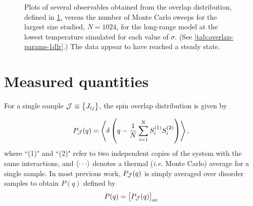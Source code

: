 \begin{figure}
  \centering
  \begin{subfigure}[b]{0.32\textwidth}
    \centering
    
    \label{fig:delta-vs-t-1dlr}
  \end{subfigure}
  \begin{subfigure}[b]{0.32\textwidth}
    \centering
    
    \label{fig:Iav-vs-t-1dlr}
  \end{subfigure}
  \begin{subfigure}[b]{0.32\textwidth}
    \centering
    
    \label{fig:Imed-vs-t-1dlr}
  \end{subfigure}
  \caption[
    Plots of various statistics of the spin overlap distribution as a function
    of Monte Carlo time, indicating that the quantities have reached a steady
    state.
  ]
  {
    Plots of several observables obtained from the overlap distribution,
    defined in \cref{sec:overlap-quantities}, versus the number of Monte Carlo
    sweeps for the largest size studied, $N=1024$, for the long-range model at
    the lowest temperature simulated for each value of $\sigma$. (See
    \cref{tab:overlap-params-1dlr}.) The data appear to have reached a steady
    state.
  }
  \label{fig:overlap-stats-vs-time}
\end{figure}


\section{Measured quantities}
\label{sec:overlap-quantities}

For a single sample $\mathcal{J}\equiv\cbr{J_{ij}}$, the spin overlap
distribution is given by

\begin{equation}
  P_{\mathcal{J}}(q) = \left< \delta\left(q - \frac{1}{N}\sum_{i=1}^N S_i^{(1)} S_i^{(2)}\right) \right>,
  \label{eq:sample-pofq}
\end{equation}
where ``(1)" and ``(2)" refer to two independent copies of the system with the
same interactions, and $\av{\cdots}$ denotes a thermal (\emph{i.e.} Monte
Carlo) average for a single sample. In most previous work, $P_{\mathcal{J}}(q)$
is simply averaged over disorder samples to obtain $P(q)$ defined by
\begin{equation}
  P(q) = \left[P_{\mathcal{J}}(q)\right]_{\mathrm{av}}
  \label{eq:pofq}
\end{equation}

